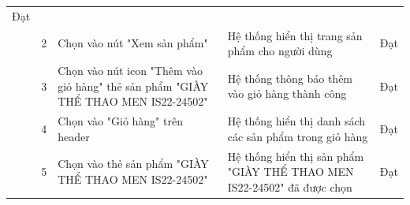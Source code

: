 {\begin{longtable}{| p{2.5cm}| p{1cm}| p{5.5cm}| p{4.5cm} | p{1.5cm} |}
        Đạt                                                                                                                                                                                            \\
        \cline{2-5}
                                                                                                        & 2                  &
        Chọn vào nút "Xem sản phẩm"                                                                     &
        Hệ thống hiển thị trang sản phẩm cho người dùng                                                 &
        Đạt                                                                                                                                                                                            \\
        \cline{2-5}
                                                                                                        & 3                  &
        Chọn vào nút icon "Thêm vào giỏ hàng" thẻ sản phẩm "GIÀY THỂ THAO MEN IS22-24502"               &
        Hệ thống thông báo thêm vào giỏ hàng thành công                                                 &
        Đạt                                                                                                                                                                                            \\
        \cline{2-5}
                                                                                                        & 4                  &
        Chọn vào "Giỏ hàng" trên header                                                                 &
        Hệ thống hiển thị danh sách các sản phẩm trong giỏ hàng                                         &
        Đạt                                                                                                                                                                                            \\
        \cline{2-5}
                                                                                                        & 5                  &
        Chọn vào thẻ sản phẩm "GIÀY THỂ THAO MEN IS22-24502"                                            &
        Hệ thống hiển thị sản phẩm "GIÀY THỂ THAO MEN IS22-24502" đã được chọn                          &
        Đạt                                                                                                                                                                                            \\

\end{longtable}}
